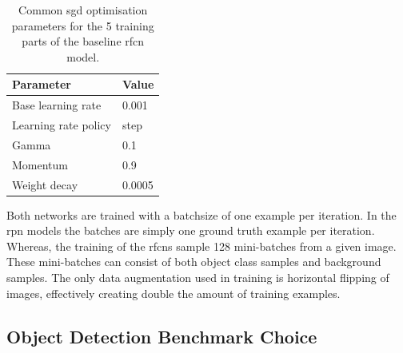 \begin{table}[h]
\centering
\caption{Common \gls{sgd} optimisation parameters for the 5 training parts of the baseline \gls{rfcn} model.}
\label{tab:trainparams}
\begin{tabular}{|l|l|}
\hline
\textbf{Parameter}            & \textbf{Value}  \\ \hline
Base learning rate   & 0.001  \\ \hline
Learning rate policy & step   \\ \hline
Gamma                & 0.1    \\ \hline
Momentum             & 0.9    \\ \hline
Weight decay         & 0.0005 \\ \hline
\end{tabular}
\end{table}

 Both networks are trained with a batchsize of one example per iteration. In the \gls{rpn} models the batches are simply one ground truth example per iteration. Whereas, the training of the \glspl{rfcn} sample 128 mini-batches from a given image. These mini-batches can consist of both object class samples and background samples. 
 The only data augmentation used in training is horizontal flipping of images, effectively creating double the amount of training examples.

 \subsection{Object Detection Benchmark Choice}


